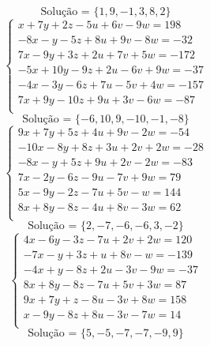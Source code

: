 \documentclass[12pt,oneside,a4paper]{article}
\begin{document}
\begin{equation*}
\text{Solução = }\{1,9,-1,3,8,2\}
\end{equation*}
\vspace{\baselineskip}
\begin{equation*}
\begin{cases}
x+7y+2z-5u+6v-9w=198 \\
-8x-y-5z+8u+9v-8w=-32 \\
7x-9y+3z+2u+7v+5w=-172 \\
-5x+10y-9z+2u-6v+9w=-37 \\
-4x-3y-6z+7u-5v+4w=-157 \\
7x+9y-10z+9u+3v-6w=-87 \\
\end{cases}
\end{equation*}
\begin{equation*}
\text{Solução = }\{-6,10,9,-10,-1,-8\}
\end{equation*}
\vspace{\baselineskip}
\begin{equation*}
\begin{cases}
9x+7y+5z+4u+9v-2w=-54 \\
-10x-8y+8z+3u+2v+2w=-28 \\
-8x-y+5z+9u+2v-2w=-83 \\
7x-2y-6z-9u-7v+9w=79 \\
5x-9y-2z-7u+5v-w=144 \\
8x+8y-8z-4u+8v-3w=62 \\
\end{cases}
\end{equation*}
\begin{equation*}
\text{Solução = }\{2,-7,-6,-6,3,-2\}
\end{equation*}
\vspace{\baselineskip}
\begin{equation*}
\begin{cases}
4x-6y-3z-7u+2v+2w=120 \\
-7x-y+3z+u+8v-w=-139 \\
-4x+y-8z+2u-3v-9w=-37 \\
8x+8y-8z-7u+5v+3w=87 \\
9x+7y+z-8u-3v+8w=158 \\
x-9y-8z+8u-3v-7w=14 \\
\end{cases}
\end{equation*}
\begin{equation*}
\text{Solução = }\{5,-5,-7,-7,-9,9\}
\end{equation*}
\end{document}
